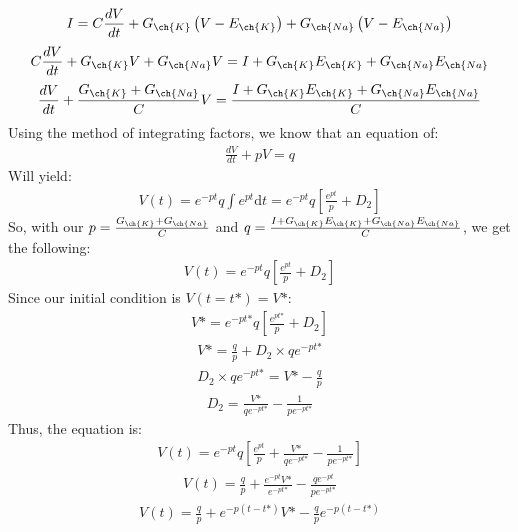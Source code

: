 \documentclass[11pt]{article}
\begin{document}
\begin{enumerate}[label=\arabic*.]
\begin{enumerate}[label=(\alph*)]
\begin{align*}
I = C \frac{dV} {dt} + G_{\ch{K}} \left(V - E_{\ch{K}}\right) + G_{\ch{Na}} \left(V - E_{\ch{Na}}\right)
\end{align*}
\begin{align*}
C \frac{dV} {dt} + G_{\ch{K}} V + G_{\ch{Na}} V = I + G_{\ch{K}} E_{\ch{K}} + G_{\ch{Na}} E_{\ch{Na}}
\end{align*}
\begin{align*}
\frac{dV} {dt} + \frac{G_{\ch{K}} + G_{\ch{Na}}} {C} V = \frac{I + G_{\ch{K}} E_{\ch{K}} + G_{\ch{Na}} E_{\ch{Na}}} {C}
\end{align*}
Using the method of integrating factors, we know that an equation of:
\begin{align*}
\frac{dV} {dt} + p V = q
\end{align*}
Will yield:
\begin{align*}
V(t) = e^{-pt} q \int e^{pt} \mathrm{d}t = e^{-pt} q \left[\frac{e^{pt}} {p} + D_2\right]
\end{align*}
So, with our $p = \frac{G_{\ch{K}} + G_{\ch{Na}}} {C}$ and $q = \frac{I + G_{\ch{K}} E_{\ch{K}} + G_{\ch{Na}} E_{\ch{Na}}} {C}$, we get the following:
\begin{align*}
V(t) = e^{-pt} q \left[\frac{e^{pt}} {p} + D_2\right]
\end{align*}
Since our initial condition is $V(t = t\text{*}) = V\text{*}$:
\begin{align*}
V\text{*} = e^{-pt\text{*}} q \left[\frac{e^{pt\text{*}}} {p} + D_2\right]
\end{align*}
\begin{align*}
V\text{*} = \frac{q} {p} + D_2 \times q e^{-pt\text{*}}
\end{align*}
\begin{align*}
D_2 \times q e^{-pt\text{*}} = V\text{*} - \frac{q} {p}
\end{align*}
\begin{align*}
D_2 = \frac{V\text{*}} {q e^{-pt\text{*}}} - \frac{1} {p e^{-pt\text{*}}}
\end{align*}
Thus, the equation is:
\begin{align*}
V(t) = e^{-pt} q \left[\frac{e^{pt}} {p} + \frac{V\text{*}} {q e^{-pt\text{*}}} - \frac{1} {p e^{-pt\text{*}}}\right]
\end{align*}
\begin{align*}
V(t) = \frac{q} {p} + \frac{e^{-pt} V\text{*}} {e^{-pt\text{*}}} - \frac{q e^{-pt}} {p e^{-pt\text{*}}}
\end{align*}
\begin{align*}
V(t) = \frac{q} {p} + e^{-p\left(t - t\text{*}\right)} V\text{*} - \frac{q} {p} e^{-p\left(t - t\text{*}\right)}

\end{align*}
\end{enumerate}
\end{enumerate}
\end{document}
